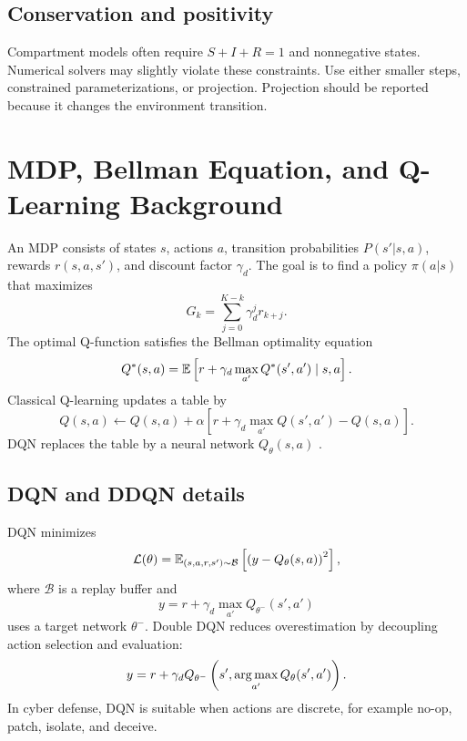 \documentclass[11pt,a4paper]{article}
\begin{document}
\subsection{Conservation and positivity}
Compartment models often require $S+I+R=1$ and nonnegative states. Numerical solvers may slightly violate these constraints. Use either smaller steps, constrained parameterizations, or projection. Projection should be reported because it changes the environment transition.

\section{MDP, Bellman Equation, and Q-Learning Background}\label{app:rl-background}
An MDP consists of states $s$, actions $a$, transition probabilities $P(s'|s,a)$, rewards $r(s,a,s')$, and discount factor $\gamma_d$. The goal is to find a policy $\pi(a|s)$ that maximizes
\begin{equation}
    G_k=\sum_{j=0}^{K-k}\gamma_d^j r_{k+j}.
\end{equation}
The optimal Q-function satisfies the Bellman optimality equation
\begin{equation}
    Q^*(s,a)=\mathbb{E}\left[r+\gamma_d\max_{a'}Q^*(s',a')\mid s,a\right].
\end{equation}
Classical Q-learning updates a table by
\begin{equation}
Q(s,a)\leftarrow Q(s,a)+\alpha\left[r+\gamma_d\max_{a'}Q(s',a')-Q(s,a)\right].
\end{equation}
DQN replaces the table by a neural network $Q_\theta(s,a)$ 
\cite{mnih2015}.

\subsection{DQN and DDQN details}
DQN minimizes
\begin{equation}
    \mathcal{L}(\theta)=\mathbb{E}_{(s,a,r,s')\sim\mathcal{B}}\left[\left(y-Q_\theta(s,a)\right)^2\right],
\end{equation}
where $\mathcal{B}$ is a replay buffer and
\begin{equation}
    y=r+\gamma_d\max_{a'}Q_{\theta^-}(s',a')
\end{equation}
uses a target network $\theta^-$. Double DQN reduces overestimation by decoupling action selection and evaluation:
\begin{equation}
    y=r+\gamma_d Q_{\theta^-}\left(s',\operatorname*{arg\,max}_{a'}Q_\theta(s',a')\right).
\end{equation}
In cyber defense, DQN is suitable when actions are discrete, for example no-op, patch, isolate, and deceive.
\end{document}
